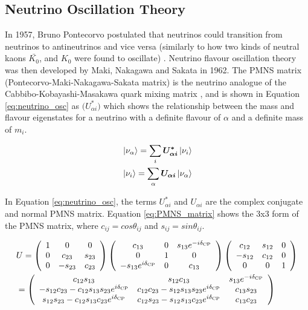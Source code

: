 \subsection{Neutrino Oscillation Theory}
In 1957, Bruno Pontecorvo postulated that neutrinos could transition from neutrinos to antineutrinos and vice versa (similarly to how two kinds of neutral kaons $\bar{K_{0}}$, and $K_{0}$ were found to oscillate) \cite{Pontecorvo:1957cp}. Neutrino flavour oscillation theory was then developed by Maki, Nakagawa and Sakata in 1962. The PMNS matrix (Pontecorvo-Maki-Nakagawa-Sakata matrix) is the neutrino analogue of the Cabbibo-Kobayashi-Masakawa quark mixing matrix \cite{maki_pmns}, and is shown in Equation \ref{eq:neutrino_osc} as $\boldsymbol(U_{\alpha i}^{*})$ which shows the relationship between the mass and flavour eigenstates for a neutrino with a definite flavour of $\alpha$ and a definite mass of $m_{i}$.


\begin{align}
&\left|\nu_{\alpha}\right\rangle=\sum_{i} \boldsymbol{U_{\alpha i}^{*}}\left|\nu_{i}\right\rangle \label{eq:neutrino_osc}  \\
&\left|\nu_{i}\right\rangle=\sum_{\alpha} \boldsymbol{U_{\alpha i}}\left|\nu_{\alpha}\right\rangle \notag
\end{align}


In Equation \ref{eq:neutrino_osc}, the terms $U_{\alpha i}^{*}$ and $U_{\alpha i}$ are the complex conjugate and normal PMNS matrix. Equation \ref{eq:PMNS_matrix} shows the 3x3 form of the PMNS matrix, where $c_{ij} = cos {\theta_{ij}}$ and $s_{ij} = sin {\theta_{ij}}$.

\begin{align}
&U=\left(\begin{array}{ccc} \label{eq:PMNS_matrix}
1 & 0 & 0 \\
0 & c_{23} & s_{23} \\
0 & -s_{23} & c_{23}
\end{array}\right)\left(\begin{array}{ccc}
c_{13} & 0 & s_{13} e^{-i \delta_{\mathrm{CP}}} \\
0 & 1 & 0 \\
-s_{13} e^{i \delta_{\mathrm{CP}}} & 0 & c_{13}
\end{array}\right)\left(\begin{array}{ccc}
c_{12} & s_{12} & 0 \\
-s_{12} & c_{12} & 0 \\
0 & 0 & 1
\end{array}\right)\\
&=\left(\begin{array}{ccc} \notag
c_{12} s_{13} & s_{12} c_{13} & s_{13} e^{-i \delta_{\mathrm{CP}}} \\
-s_{12} c_{23}-c_{12} s_{13} s_{23} e^{i \delta_{\mathrm{CP}}} & c_{12} c_{23}-s_{12} s_{13} s_{23} e^{i \delta_{\mathrm{CP}}} & c_{13} s_{23} \\
s_{12} s_{23}-c_{12} s_{13} c_{23} e^{i \delta_{\mathrm{CP}}} & c_{12} s_{23}-s_{12} s_{13} c_{23} e^{i \delta_{\mathrm{CP}}} & c_{13} c_{23}
\end{array}\right)
\end{align}



